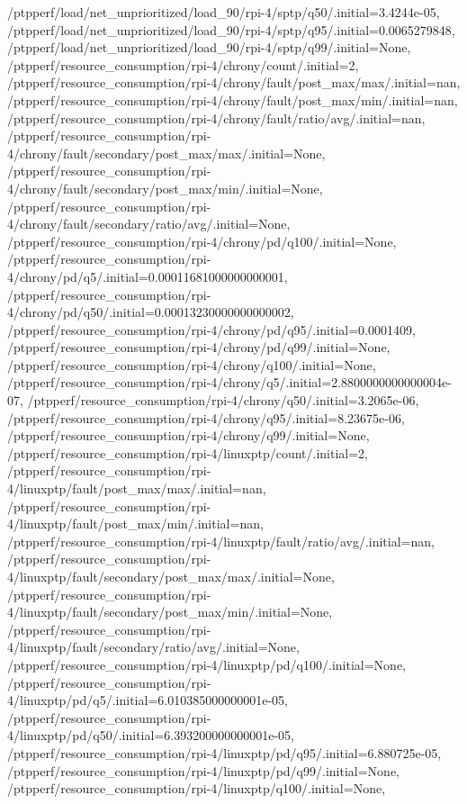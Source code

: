 {    /ptpperf/load/net_unprioritized/load_90/rpi-4/sptp/q50/.initial=3.4244e-05,
    /ptpperf/load/net_unprioritized/load_90/rpi-4/sptp/q95/.initial=0.0065279848,
    /ptpperf/load/net_unprioritized/load_90/rpi-4/sptp/q99/.initial=None,
    /ptpperf/resource_consumption/rpi-4/chrony/count/.initial=2,
    /ptpperf/resource_consumption/rpi-4/chrony/fault/post_max/max/.initial=nan,
    /ptpperf/resource_consumption/rpi-4/chrony/fault/post_max/min/.initial=nan,
    /ptpperf/resource_consumption/rpi-4/chrony/fault/ratio/avg/.initial=nan,
    /ptpperf/resource_consumption/rpi-4/chrony/fault/secondary/post_max/max/.initial=None,
    /ptpperf/resource_consumption/rpi-4/chrony/fault/secondary/post_max/min/.initial=None,
    /ptpperf/resource_consumption/rpi-4/chrony/fault/secondary/ratio/avg/.initial=None,
    /ptpperf/resource_consumption/rpi-4/chrony/pd/q100/.initial=None,
    /ptpperf/resource_consumption/rpi-4/chrony/pd/q5/.initial=0.00011681000000000001,
    /ptpperf/resource_consumption/rpi-4/chrony/pd/q50/.initial=0.00013230000000000002,
    /ptpperf/resource_consumption/rpi-4/chrony/pd/q95/.initial=0.0001409,
    /ptpperf/resource_consumption/rpi-4/chrony/pd/q99/.initial=None,
    /ptpperf/resource_consumption/rpi-4/chrony/q100/.initial=None,
    /ptpperf/resource_consumption/rpi-4/chrony/q5/.initial=2.8800000000000004e-07,
    /ptpperf/resource_consumption/rpi-4/chrony/q50/.initial=3.2065e-06,
    /ptpperf/resource_consumption/rpi-4/chrony/q95/.initial=8.23675e-06,
    /ptpperf/resource_consumption/rpi-4/chrony/q99/.initial=None,
    /ptpperf/resource_consumption/rpi-4/linuxptp/count/.initial=2,
    /ptpperf/resource_consumption/rpi-4/linuxptp/fault/post_max/max/.initial=nan,
    /ptpperf/resource_consumption/rpi-4/linuxptp/fault/post_max/min/.initial=nan,
    /ptpperf/resource_consumption/rpi-4/linuxptp/fault/ratio/avg/.initial=nan,
    /ptpperf/resource_consumption/rpi-4/linuxptp/fault/secondary/post_max/max/.initial=None,
    /ptpperf/resource_consumption/rpi-4/linuxptp/fault/secondary/post_max/min/.initial=None,
    /ptpperf/resource_consumption/rpi-4/linuxptp/fault/secondary/ratio/avg/.initial=None,
    /ptpperf/resource_consumption/rpi-4/linuxptp/pd/q100/.initial=None,
    /ptpperf/resource_consumption/rpi-4/linuxptp/pd/q5/.initial=6.010385000000001e-05,
    /ptpperf/resource_consumption/rpi-4/linuxptp/pd/q50/.initial=6.393200000000001e-05,
    /ptpperf/resource_consumption/rpi-4/linuxptp/pd/q95/.initial=6.880725e-05,
    /ptpperf/resource_consumption/rpi-4/linuxptp/pd/q99/.initial=None,
    /ptpperf/resource_consumption/rpi-4/linuxptp/q100/.initial=None,
}
